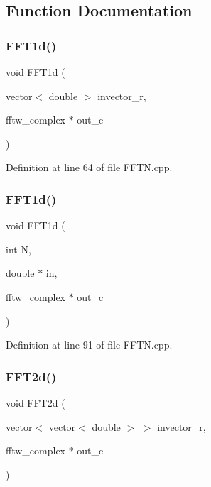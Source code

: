 \subsection{Function Documentation}
\mbox{\label{FFTN_8cpp_aec6fc81ea724de209c50a8b3ab3be161_aec6fc81ea724de209c50a8b3ab3be161}} 
\subsubsection{F\+F\+T1d()\hspace{0.1cm}{\footnotesize\ttfamily [1/2]}}
{\footnotesize\ttfamily void F\+F\+T1d (\begin{DoxyParamCaption}\item[{vector$<$ double $>$}]{invector\+\_\+r,  }\item[{fftw\+\_\+complex $\ast$}]{out\+\_\+c }\end{DoxyParamCaption})}



Definition at line 64 of file F\+F\+T\+N.\+cpp.

\mbox{\label{FFTN_8cpp_a22d3077cd59f8e921c2acde1977b9383_a22d3077cd59f8e921c2acde1977b9383}} 
\subsubsection{F\+F\+T1d()\hspace{0.1cm}{\footnotesize\ttfamily [2/2]}}
{\footnotesize\ttfamily void F\+F\+T1d (\begin{DoxyParamCaption}\item[{int}]{N,  }\item[{double $\ast$}]{in,  }\item[{fftw\+\_\+complex $\ast$}]{out\+\_\+c }\end{DoxyParamCaption})}



Definition at line 91 of file F\+F\+T\+N.\+cpp.

\mbox{\label{FFTN_8cpp_a9c926bdffb37048d2b93b1cadfbf11e7_a9c926bdffb37048d2b93b1cadfbf11e7}} 
\subsubsection{F\+F\+T2d()\hspace{0.1cm}{\footnotesize\ttfamily [1/2]}}
{\footnotesize\ttfamily void F\+F\+T2d (\begin{DoxyParamCaption}\item[{vector$<$ vector$<$ double $>$ $>$}]{invector\+\_\+r,  }\item[{fftw\+\_\+complex $\ast$}]{out\+\_\+c }\end{DoxyParamCaption})}



